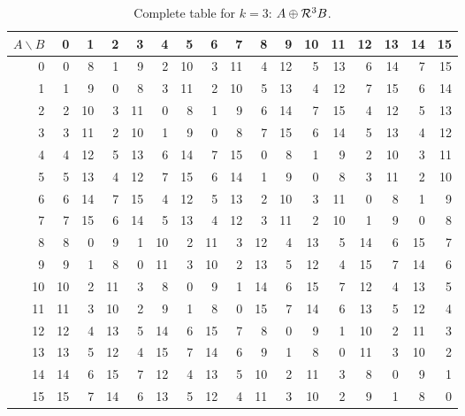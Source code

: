 \begin{table}[!htbp]\centering\small
\setlength{\tabcolsep}{5.0pt}\renewcommand{\arraystretch}{1.10}
\begin{tabular}{r|rrrrrrrrrrrrrrrr}\toprule
$A\backslash B$ & 0 & 1 & 2 & 3 & 4 & 5 & 6 & 7 & 8 & 9 & 10 & 11 & 12 & 13 & 14 & 15\\\midrule
0 & 0 & 8 & 1 & 9 & 2 & 10 & 3 & 11 & 4 & 12 & 5 & 13 & 6 & 14 & 7 & 15\\
1 & 1 & 9 & 0 & 8 & 3 & 11 & 2 & 10 & 5 & 13 & 4 & 12 & 7 & 15 & 6 & 14\\
2 & 2 & 10 & 3 & 11 & 0 & 8 & 1 & 9 & 6 & 14 & 7 & 15 & 4 & 12 & 5 & 13\\
3 & 3 & 11 & 2 & 10 & 1 & 9 & 0 & 8 & 7 & 15 & 6 & 14 & 5 & 13 & 4 & 12\\
4 & 4 & 12 & 5 & 13 & 6 & 14 & 7 & 15 & 0 & 8 & 1 & 9 & 2 & 10 & 3 & 11\\
5 & 5 & 13 & 4 & 12 & 7 & 15 & 6 & 14 & 1 & 9 & 0 & 8 & 3 & 11 & 2 & 10\\
6 & 6 & 14 & 7 & 15 & 4 & 12 & 5 & 13 & 2 & 10 & 3 & 11 & 0 & 8 & 1 & 9\\
7 & 7 & 15 & 6 & 14 & 5 & 13 & 4 & 12 & 3 & 11 & 2 & 10 & 1 & 9 & 0 & 8\\
8 & 8 & 0 & 9 & 1 & 10 & 2 & 11 & 3 & 12 & 4 & 13 & 5 & 14 & 6 & 15 & 7\\
9 & 9 & 1 & 8 & 0 & 11 & 3 & 10 & 2 & 13 & 5 & 12 & 4 & 15 & 7 & 14 & 6\\
10 & 10 & 2 & 11 & 3 & 8 & 0 & 9 & 1 & 14 & 6 & 15 & 7 & 12 & 4 & 13 & 5\\
11 & 11 & 3 & 10 & 2 & 9 & 1 & 8 & 0 & 15 & 7 & 14 & 6 & 13 & 5 & 12 & 4\\
12 & 12 & 4 & 13 & 5 & 14 & 6 & 15 & 7 & 8 & 0 & 9 & 1 & 10 & 2 & 11 & 3\\
13 & 13 & 5 & 12 & 4 & 15 & 7 & 14 & 6 & 9 & 1 & 8 & 0 & 11 & 3 & 10 & 2\\
14 & 14 & 6 & 15 & 7 & 12 & 4 & 13 & 5 & 10 & 2 & 11 & 3 & 8 & 0 & 9 & 1\\
15 & 15 & 7 & 14 & 6 & 13 & 5 & 12 & 4 & 11 & 3 & 10 & 2 & 9 & 1 & 8 & 0\\
\bottomrule\end{tabular}
\caption{Complete table for $k=3$: $A\oplus\mathcal R^3B$.}
\end{table}
